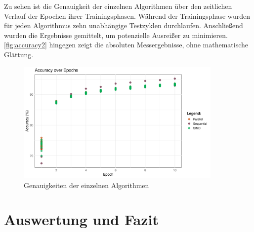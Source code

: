 \documentclass[a4paper, 12pt]{article}
\begin{document}
Zu sehen ist die Genauigkeit der einzelnen Algorithmen über den zeitlichen Verlauf der Epochen 
ihrer Trainingsphasen. Während der Trainingsphase wurden für jeden Algorithmus zehn unabhängige 
Testzyklen durchlaufen. Anschließend wurden die Ergebnisse gemittelt, um potenzielle Ausreißer 
zu minimieren. \autoref{fig:accuracy2} hingegen zeigt die absoluten Messergebnisse, 
ohne mathematische Glättung.

\begin{figure}[H]
    \begin{center}
        \includegraphics[width=10cm]{Bilders/accuracy_plot2.png}
        \caption{Genauigkeiten der einzelnen Algorithmen}
        \label{fig:accuracy2}
    \end{center}
\end{figure}


\newpage %
\clearpage

\section{Auswertung und Fazit}

\newpage %



\end{document}
